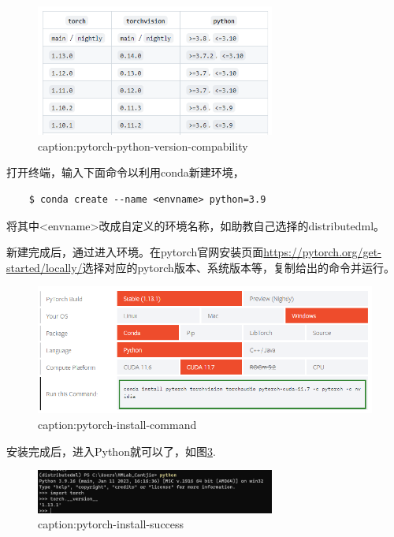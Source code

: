 \begin{figure}[htbp]
	\centering
	\includegraphics[width=0.7\textwidth]{figures/pytorch-python-version-compability.png}
	\caption{caption:pytorch-python-version-compability}
	\label{fig:pytorch-python-version-compability}
\end{figure}

打开终端，输入下面命令以利用conda新建环境，
\begin{lstlisting}
    $ conda create --name <envname> python=3.9
\end{lstlisting}
将其中<envname>改成自定义的环境名称，如助教自己选择的distributedml。

新建完成后，通过进入环境。在pytorch官网安装页面\url{https://pytorch.org/get-started/locally/}选择对应的pytorch版本、系统版本等，复制给出的命令并运行。

\begin{figure}[htbp]
	\centering
	\includegraphics[width=1\textwidth]{figures/pytorch-install-command.png}
	\caption{caption:pytorch-install-command}
	\label{fig:pytorch-install-command}
\end{figure}

安装完成后，进入Python就可以了，如图\ref{fig:pytorch-install-success}.

\begin{figure}[htbp]
	\centering
	\includegraphics[width=0.7\textwidth]{figures/pytorch-install-success.png}
	\caption{caption:pytorch-install-success}
	\label{fig:pytorch-install-success}
\end{figure}

